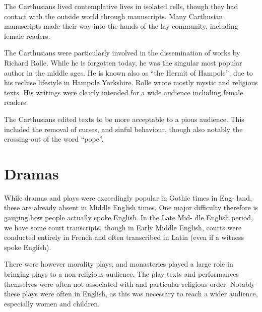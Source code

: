 \documentclass[12pt]{report}
\begin{document}
The Carthusians lived contemplative lives in isolated cells, though they had contact with the outside world through manuscripts. Many Carthusian manuscripts made their way into the hands of the lay community, including female readers.

The Carthusians were particularly involved in the dissemination of works by Richard Rolle. While he is forgotten today, he was the singular most popular author in the middle ages. He is known also as “the Hermit of Hampole”, due to his recluse lifestyle in Hampole Yorkshire. Rolle wrote mostly mystic and religious texts. His writings were clearly intended for a wide audience including female readers.

The Carthusians edited texts to be more acceptable to a pious audience. This included the removal of curses, and sinful behaviour, though also notably the crossing-out of the word “pope”.

\section{Dramas}

While dramas and plays were exceedingly popular in Gothic times in Eng- land, these are already absent in Middle English times. One major difficulty therefore is gauging how people actually spoke English. In the Late Mid- dle English period, we have some court transcripts, though in Early Middle English, courts were conducted entirely in French and often transcribed in Latin (even if a witness spoke English).

There were however morality plays, and monasteries played a large role in bringing plays to a non-religious audience. The play-texts and performances themselves were often not associated with and particular religious order. Notably these plays were often in English, as this was necessary to reach a wider audience, especially women and children.
\end{document}
